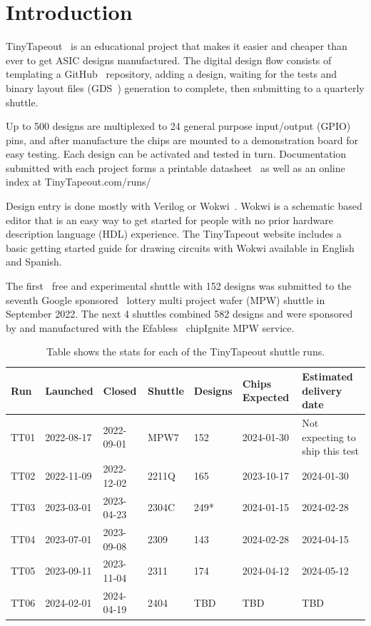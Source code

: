\section{Introduction}
\label{sec:introduction}
TinyTapeout~\cite{tinytapeout} is an educational project that makes it easier and cheaper than ever to get ASIC designs manufactured.
The digital design flow consists of templating a GitHub~\cite{github} repository, adding a design, waiting for the tests and binary layout files (GDS~\cite{gds}) generation to complete, then submitting to a quarterly shuttle.

Up to 500 designs are multiplexed to 24 general purpose input/output (GPIO) pins, and after manufacture the chips are mounted to a demonstration board for easy testing.
Each design can be activated and tested in turn.
Documentation submitted with each project forms a printable datasheet~\cite{datasheet} as well as an online index at TinyTapeout.com/runs/~\cite{tinytapeoutruns}

Design entry is done mostly with Verilog or Wokwi~\cite{wokwi}.
Wokwi is a schematic based editor that is an easy way to get started for people with no prior hardware description language (HDL) experience.
The TinyTapeout website includes a basic getting started guide for drawing circuits with Wokwi available in English and Spanish.

The first~\cite{firstshuttle} free and experimental shuttle with 152 designs was submitted to the seventh Google sponsored~\cite{googlesponsored} lottery multi project wafer (MPW) shuttle in September 2022.
The next 4 shuttles combined 582 designs and were sponsored by and manufactured with the Efabless~\cite{efabless} chipIgnite MPW service.

\begin{table}[htbp]
\centering
\caption{Table shows the stats for each of the TinyTapeout shuttle runs.}
\label{tab:tinytapeout}
\begin{tabularx}{\textwidth}{@{}l *{6}{X}@{}}
\toprule
\textbf{Run} & \textbf{Launched} & \textbf{Closed} & \textbf{Shuttle} & \textbf{Designs} & \textbf{Chips Expected} & \textbf{Estimated delivery date} \\
\midrule
TT01 & 2022-08-17 & 2022-09-01 & MPW7  & 152 & 2024-01-30 & Not expecting to ship this test \\
TT02 & 2022-11-09 & 2022-12-02 & 2211Q & 165 & 2023-10-17 & 2024-01-30 \\
TT03 & 2023-03-01 & 2023-04-23 & 2304C & 249* & 2024-01-15 & 2024-02-28 \\
TT04 & 2023-07-01 & 2023-09-08 & 2309  & 143 & 2024-02-28 & 2024-04-15 \\
TT05 & 2023-09-11 & 2023-11-04 & 2311  & 174 & 2024-04-12 & 2024-05-12 \\
TT06 & 2024-02-01 & 2024-04-19 & 2404  & TBD & TBD        & TBD \\
\bottomrule
\end{tabularx}
\end{table}

